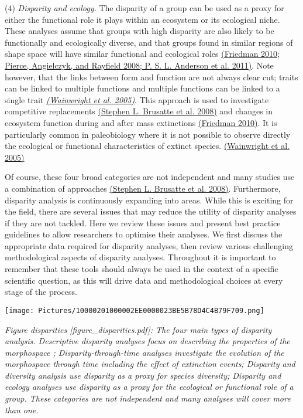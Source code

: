 (4) \emph{Disparity and ecology. }The disparity of a group can be used
as a proxy for either the functional role it plays within an ecosystem
or its ecological niche. These analyses assume that groups with high
disparity are also likely to be functionally and ecologically diverse,
and that groups found in similar regions of shape space will have
similar functional and ecological roles
\href{https://paperpile.com/c/sTGYvp/EETc+tSIy+qjj9}{(Friedman 2010;
Pierce, Angielczyk, and Rayfield 2008; P. S. L. Anderson et al. 2011)}.
Note however, that the links between form and function are not always
clear cut; traits can be linked to multiple functions and multiple
functions can be linked to a single trait
\href{https://paperpile.com/c/sTGYvp/Ejzr}{\emph{(Wainwright et al.
2005)}}. This approach is used to investigate competitive replacements
\href{https://paperpile.com/c/sTGYvp/EeC8}{(Stephen L. Brusatte et al.
2008)} and changes in ecosystem function during and after mass
extinctions \href{https://paperpile.com/c/sTGYvp/EETc}{(Friedman 2010)}.
It is particularly common in paleobiology where it is not possible to
observe directly the ecological or functional characteristics of extinct
species. \href{https://paperpile.com/c/sTGYvp/Ejzr}{(Wainwright et al.
2005)}

Of course, these four broad categories are not independent and many
studies use a combination of approaches
\href{https://paperpile.com/c/sTGYvp/EeC8}{(Stephen L. Brusatte et al.
2008)}. Furthermore, disparity analysis is continuously expanding into
areas. While this is exciting for the field, there are several issues
that may reduce the utility of disparity analyses if they are not
tackled. Here we review these issues and present best practice
guidelines to allow researchers to optimise their analyses. We first
discuss the appropriate data required for disparity analyses, then
review various challenging methodological aspects of disparity analyses.
Throughout it is important to remember that these tools should always be
used in the context of a specific scientific question, as this will
drive data and methodological choices at every stage of the process.

\texttt{[image: Pictures/10000201000002EE0000023BE5B78D4C4B79F709.png]}

\emph{Figure disparities {[}figure\_disparities.pdf{]}: The four main
types of disparity analysis. Descriptive disparity analyses focus on
describing the properties of the morphospace ; Disparity-through-time
analyses investigate the evolution of the morphospace through time
including the effect of extinction events; Disparity and diversity
analysis use disparity as a proxy for species diversity; Disparity and
ecology analyses use disparity as a proxy for the ecological or
functional role of a group. These categories are not independent and
many analyses will cover more than one.}

